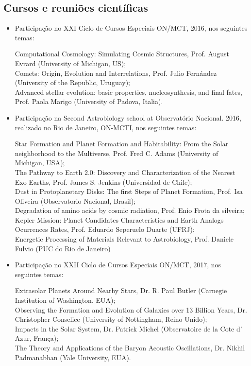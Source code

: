 \documentclass[a4paper, 11pt]{article}
\begin{document}
\subsection{Cursos e reuni\~oes cient\'ificas}

\begin{itemize}
	\item Participação no XXI Ciclo de Cursos Especiais ON/MCT, 2016, nos seguintes temas: 

  Computational Cosmology: Simulating Cosmic Structures, Prof. August Evrard (University of Michigan, US); \\
  Comets: Origin, Evolution and Interrelations, Prof. Julio Fernández (University of the Republic, Uruguay); \\
  Advanced stellar evolution: basic properties, nucleosynthesis, and final fates, Prof. Paola Marigo (University of Padova, Italia).

	\item Participação na Second Astrobiology school at Observatório Nacional. 2016, realizado no Rio de Janeiro, ON-MCTI, nos seguintes temas: 

  Star Formation and Planet Formation and Habitability: From the Solar neighborhood to the Multiverse, Prof. Fred C. Adams (University of Michigan, USA); \\ The Pathway to Earth 2.0: Discovery and Characterization of the Nearest Exo-Earths, Prof. James S. Jenkins (Universidad de Chile); \\
  Dust in Protoplanetary Disks: The first Steps of Planet Formation, Prof. Isa Oliveira (Observatorio Nacional, Brasil); \\
  Degradation of amino acids by cosmic radiation, Prof. Enio Frota da silveira; \\
  Kepler Mission: Planet Candidates Characteristics and Earth Analogs Ocurrences Rates, Prof. Eduardo Seperuelo Duarte (UFRJ); \\
  Energetic Processing of Materials Relevant to Astrobiology, Prof. Daniele Fulvio (PUC do Rio de Janeiro)
	

	\item Participação no XXII Ciclo de Cursos Especiais ON/MCT, 2017, nos seguintes temas: 

  Extrasolar Planets Around Nearby Stars, Dr. R. Paul Butler (Carnegie Institution of Washington, EUA); \\
  Observing the Formation and Evolution of Galaxies over 13 Billion Years, Dr. Christopher Conselice (University of Nottingham, Reino Unido); \\
  Impacts in the Solar System, Dr. Patrick Michel (Observatoire de la Cote d' Azur, França); \\
  The Theory and Applications of the Baryon Acoustic Oscillations, Dr. Nikhil Padmanabhan (Yale University, EUA).
\end{itemize}
\end{document}
